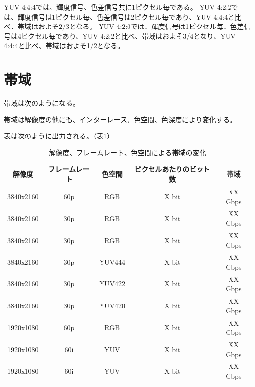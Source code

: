 
YUV 4:4:4では、輝度信号、色差信号共に1ピクセル毎である。
YUV 4:2:2では、輝度信号は1ピクセル毎、色差信号は2ピクセル毎であり、YUV 4:4:4と比べ、帯域はおよそ2/3となる。
YUV 4:2:0では、輝度信号は1ピクセル毎、色差信号は4ピクセル毎であり、YUV 4:2:2と比べ、帯域はおよそ3/4となり、YUV 4:4:4と比べ、帯域はおよそ1/2となる。

\section{帯域}
\label{sec:bandwidth}

帯域は次のようになる。

帯域は解像度の他にも、インターレース、色空間、色深度により変化する。

表は次のように出力される。（表\ref{tb:video-bandwidth}）

\begin{table}[htbp]
  \caption{解像度、フレームレート、色空間による帯域の変化}
  \label{tb:video-bandwidth}
  \begin{center}
  \begin{tabular}{c|c|c|c|c}
    \hline
    解像度     & フレームレート & 色空間 & ピクセルあたりのビット数 & 帯域\\\hline\hline
    3840x2160 & 60p          & RGB    & X bit               & XX Gbps\\\hline
    3840x2160 & 30p          & RGB    & X bit               & XX Gbps\\\hline
    3840x2160 & 30p          & RGB    & X bit               & XX Gbps\\\hline
    3840x2160 & 30p          & YUV444 & X bit               & XX Gbps\\\hline
    3840x2160 & 30p          & YUV422 & X bit               & XX Gbps\\\hline
    3840x2160 & 30p          & YUV420 & X bit               & XX Gbps\\\hline
    1920x1080 & 60p          & RGB    & X bit               & XX Gbps\\\hline
    1920x1080 & 60i          & YUV    & X bit               & XX Gbps\\\hline
    1920x1080 & 60i          & YUV    & X bit               & XX Gbps\\\hline
  \end{tabular}\end{center}
\end{table}


